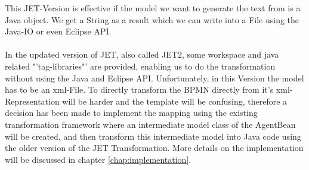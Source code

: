This JET-Version is effective if the model we want to generate the text from is a Java object. We get a String as a result which we can write into a File using the Java-IO or even Eclipse API.\\\\

In the updated version of JET, also called JET2, some workspace and java related "'tag-libraries"' are provided, enabling us to do the transformation without using the Java and Eclipse API. Unfortunately, in this Version the model has to be an xml-File.
To directly transform the BPMN directly from it's xml-Representation will be harder and the template will be confusing, therefore a decision has been made to implement the mapping using the existing transformation framework where an intermediate model class of the AgentBean will be created, and then transform this intermediate model into Java code using the older version of the JET Transformation.
More details on the implementation will be discussed in chapter \ref{chap:implementation}.